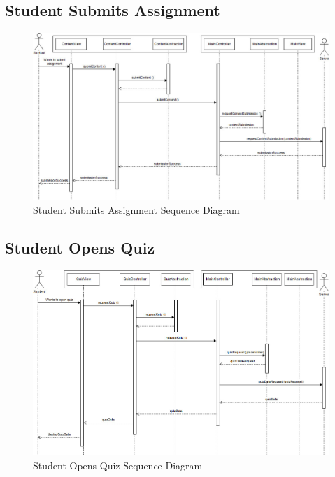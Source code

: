 \documentclass[]{article}
\begin{document}
\subsection{Student Submits Assignment}
{
\begin{figure}[H]
  \centering
  \includegraphics[scale=0.3]{A3_Assets/StudentSubmitsAssignment.jpg}
  \caption{Student Submits Assignment Sequence Diagram}
\end{figure}
}

\subsection{Student Opens Quiz}
{
\begin{figure}[H]
  \centering
  \includegraphics[scale=0.3]{A3_Assets/StudentOpensQuiz.jpg}
  \caption{Student Opens Quiz Sequence Diagram}
\end{figure}
}
\end{document}
